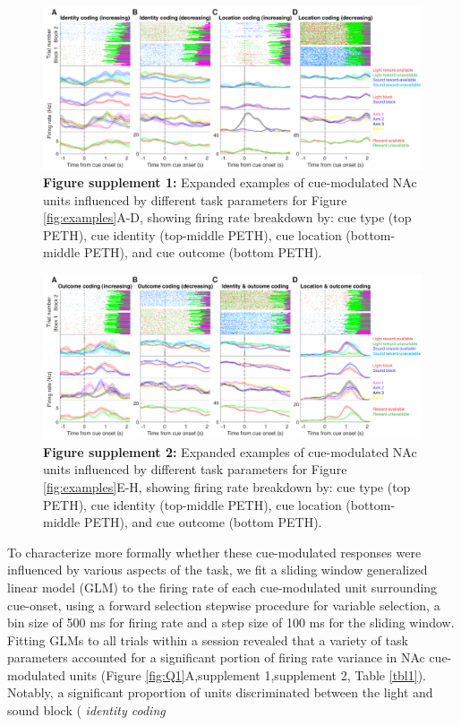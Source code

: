 \documentclass[11pt]{article}
\newcommand{\bsf}[1]{\textbf{#1}}
\providecommand{\DIFadd}[1]{{\protect\color{red} \sf #1}} %
\providecommand{\DIFdel}[1]{} %
\providecommand{\DIFaddbegin}{} %
\providecommand{\DIFaddend}{} %
\providecommand{\DIFdelbegin}{} %
\providecommand{\DIFdelend}{} %
\newcommand{\DIFscaledelfig}{0.5}
\newlength{\DIFdelgraphicswidth} %
\newlength{\DIFdelgraphicsheight} %
\newcommand{\DIFaddincludegraphics}[2][]{{\color{red}\fbox{\DIFOincludegraphics[#1]{#2}}}} %
\newcommand{\DIFdelincludegraphics}[2][]{%
\sbox{\DIFdelgraphicsbox}{\DIFOincludegraphics[#1]{#2}}%
\settoboxwidth{\DIFdelgraphicswidth}{\DIFdelgraphicsbox} %
\settoboxtotalheight{\DIFdelgraphicsheight}{\DIFdelgraphicsbox} %
\scalebox{\DIFscaledelfig}{%
\parbox[b]{\DIFdelgraphicswidth}{\usebox{\DIFdelgraphicsbox}\\[-\baselineskip] \rule{\DIFdelgraphicswidth}{0em}}\llap{\resizebox{\DIFdelgraphicswidth}{\DIFdelgraphicsheight}{%
\setlength{\unitlength}{\DIFdelgraphicswidth}%
\begin{picture}(1,1)%
\thicklines\linethickness{2pt} %
{\color[rgb]{1,0,0}\put(0,0){\framebox(1,1){}}}%
{\color[rgb]{1,0,0}\put(0,0){\line( 1,1){1}}}%
{\color[rgb]{1,0,0}\put(0,1){\line(1,-1){1}}}%
\end{picture}%
}\hspace*{3pt}}} %
} %
\DeclareRobustCommand{\DIFaddbegin}{\DIFOaddbegin \let\includegraphics\DIFaddincludegraphics} %
\DeclareRobustCommand{\DIFaddend}{\DIFOaddend \let\includegraphics\DIFOincludegraphics} %
\DeclareRobustCommand{\DIFdelbegin}{\DIFOdelbegin \let\includegraphics\DIFdelincludegraphics} %
\DeclareRobustCommand{\DIFdelend}{\DIFOaddend \let\includegraphics\DIFOincludegraphics} %
\begin{document}
 \begin{figure}[ht!]
\centering
\includegraphics[width=\textwidth]{Fig 4 - Neural examples SUPP1.pdf}
\caption*{\bsf{Figure supplement 1:} {\color{red} Expanded examples of cue-modulated NAc units influenced by different
  task parameters for Figure \ref{fig:examples}A-D, showing firing rate breakdown by: cue type (top PETH), cue identity (top-middle PETH), cue location (bottom-middle PETH), and cue outcome (bottom PETH).}}
\label{fig:examplesSUPP1}
\end{figure} \clearpage

 \begin{figure}[ht!]
\centering
\includegraphics[width=\textwidth]{Fig 4 - Neural examples SUPP2.pdf}
\caption*{\bsf{Figure supplement 2:} {\color{red} Expanded examples of cue-modulated NAc units influenced by different
  task parameters for Figure \ref{fig:examples}E-H, showing firing rate breakdown by: cue type (top PETH), cue identity (top-middle PETH), cue location (bottom-middle PETH), and cue outcome (bottom PETH).}}
\label{fig:examplesSUPP2}
\end{figure} \clearpage

\DIFadd{To characterize more formally whether these cue-modulated responses were influenced by various aspects of the task, we fit a sliding window generalized linear model (GLM) to the firing rate of each cue-modulated unit surrounding cue-onset, using a forward selection stepwise procedure for variable selection, a bin size of 500 ms for firing rate and a step size of 100 ms for the sliding window. Fitting GLMs to all trials within a session revealed that a variety of task parameters accounted for a significant portion of firing rate variance in NAc cue-modulated units (Figure \ref{fig:Q1}A,supplement 1,supplement 2, Table \ref{tbl1}). Notably, a significant proportion of units discriminated between the light and sound block (}\DIFaddend {\DIFdelbegin %
\DIFdel{Population level averages reveal characteristic response profiles:}\DIFdelend \DIFaddbegin \it \DIFadd{identity coding}\DIFaddend }\DIFdelbegin %
\end{document}
